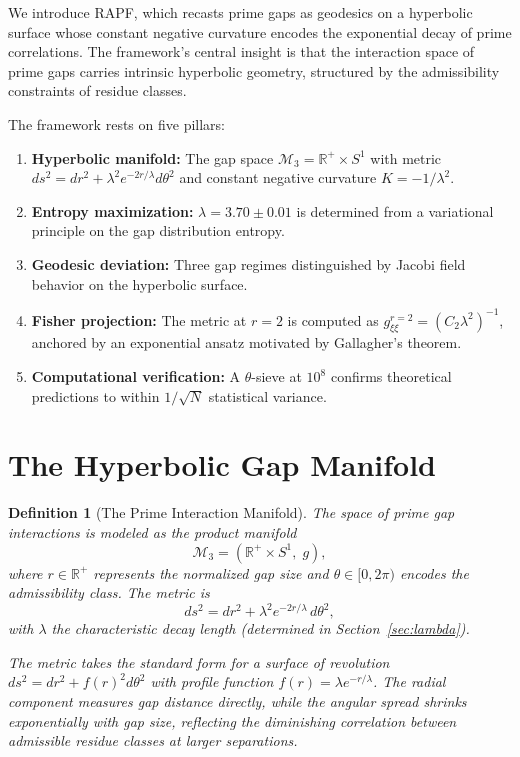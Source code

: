 \documentclass[12pt]{article}
\newtheorem{definition}[theorem]{Definition}
\begin{document}
We introduce RAPF, which recasts prime gaps as geodesics on a hyperbolic surface
whose constant negative curvature encodes the exponential decay of prime
correlations. The framework's central insight is that the interaction space of
prime gaps carries intrinsic hyperbolic geometry, structured by the admissibility
constraints of residue classes.

The framework rests on five pillars:

\begin{enumerate}
  \item \textbf{Hyperbolic manifold:} The gap space $\mathcal{M}_3 = \mathbb{R}^+ \times S^1$
    with metric $ds^2 = dr^2 + \lambda^2 e^{-2r/\lambda} d\theta^2$ and constant
    negative curvature $K = -1/\lambda^2$.
  \item \textbf{Entropy maximization:} $\lambda = 3.70 \pm 0.01$ is determined from a
    variational principle on the gap distribution entropy.
  \item \textbf{Geodesic deviation:} Three gap regimes distinguished by Jacobi
    field behavior on the hyperbolic surface.
  \item \textbf{Fisher projection:} The metric at $r=2$ is computed as
    $g_{\xi\xi}^{r=2} = (C_2 \lambda^2)^{-1}$, anchored by an exponential ansatz
    motivated by Gallagher's theorem.
  \item \textbf{Computational verification:} A $\theta$-sieve at $10^8$ confirms
    theoretical predictions to within $1/\sqrt{N}$ statistical variance.
\end{enumerate}

\section{The Hyperbolic Gap Manifold}

\begin{definition}[The Prime Interaction Manifold]
The space of prime gap interactions is modeled as the product manifold
\[
  \mathcal{M}_3 = \left(\mathbb{R}^+ \times S^1,\; g\right),
\]
where $r \in \mathbb{R}^+$ represents the normalized gap size and
$\theta \in [0, 2\pi)$ encodes the admissibility class. The metric is
\begin{equation}
  ds^2 = dr^2 + \lambda^2 e^{-2r/\lambda}\, d\theta^2,
  \label{eq:metric}
\end{equation}
with $\lambda$ the characteristic decay length (determined in
Section~\ref{sec:lambda}).

The metric takes the standard form for a surface of revolution $ds^2 = dr^2 + f(r)^2 d\theta^2$
with profile function $f(r) = \lambda e^{-r/\lambda}$. The radial component measures
gap distance directly, while the angular spread shrinks exponentially with gap size,
reflecting the diminishing correlation between admissible residue classes at larger
separations.
\end{definition}
\end{document}
